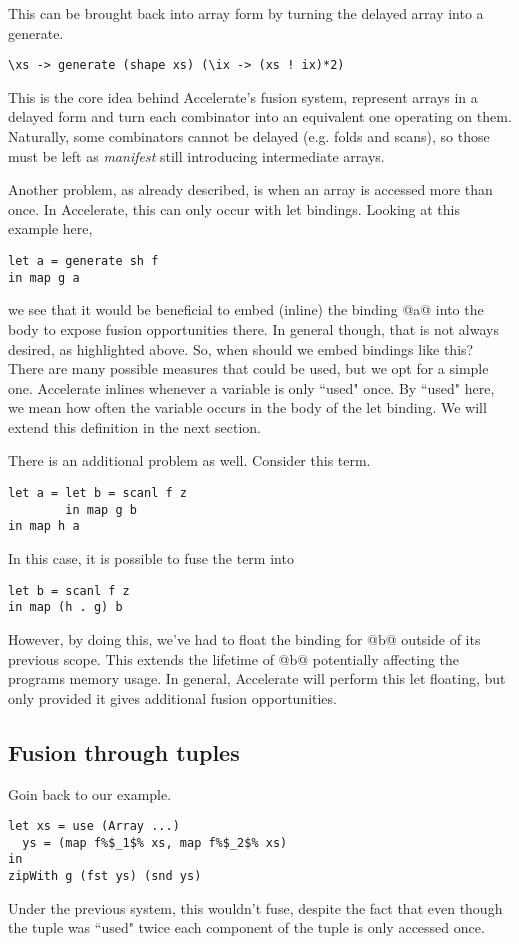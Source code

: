 This can be brought back into array form by turning the delayed array into a generate.
%
\begin{lstlisting}
\xs -> generate (shape xs) (\ix -> (xs ! ix)*2)
\end{lstlisting}
%

This is the core idea behind Accelerate's fusion system, represent arrays in a delayed form and turn each combinator into an equivalent one operating on them. Naturally, some combinators cannot be delayed (e.g. folds and scans), so those must be left as \emph{manifest} still introducing intermediate arrays.

Another problem, as already described, is when an array is accessed more than once. In Accelerate, this can only occur with let bindings. Looking at this example here,
%
\begin{lstlisting}
let a = generate sh f
in map g a
\end{lstlisting}
%
we see that it would be beneficial to embed (inline) the binding @a@ into the body to expose fusion opportunities there. In general though, that is not always desired, as highlighted above. So, when should we embed bindings like this? There are many possible measures that could be used, but we opt for a simple one. Accelerate inlines whenever a variable is only ``used" once. By ``used" here, we mean how often the variable occurs in the body of the let binding. We will extend this definition in the next section.

There is an additional problem as well. Consider this term.
%
\begin{lstlisting}
let a = let b = scanl f z
        in map g b
in map h a
\end{lstlisting}
%
In this case, it is possible to fuse the term into
%
\begin{lstlisting}
let b = scanl f z
in map (h . g) b
\end{lstlisting}
%
However, by doing this, we've had to float the binding for @b@ outside of its previous scope. This extends the lifetime of @b@ potentially affecting the programs memory usage. In general, Accelerate will perform this let floating, but only provided it gives additional fusion opportunities.

\subsection{Fusion through tuples}

Goin back to our example.
%
\begin{lstlisting}
let xs = use (Array ...)
  ys = (map f%$_1$% xs, map f%$_2$% xs)
in
zipWith g (fst ys) (snd ys)
\end{lstlisting}
%
Under the previous system, this wouldn't fuse, despite the fact that even though the tuple was ``used" twice each component of the tuple is only accessed once.

